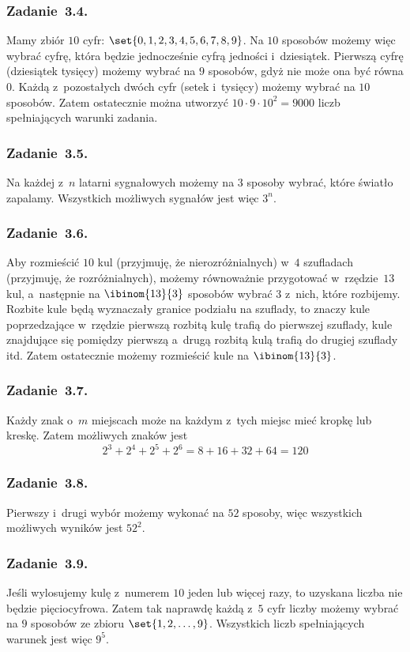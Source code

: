 \subsubsection*{Zadanie~3.4.}
Mamy zbiór \(10\) cyfr: \(\set{0, 1, 2, 3, 4, 5, 6, 7, 8, 9}\). Na \(10\) sposobów możemy więc wybrać cyfrę, która będzie jednocześnie cyfrą jedności i~dziesiątek. Pierwszą cyfrę (dziesiątek tysięcy) możemy wybrać na \(9\) sposobów, gdyż nie może ona być równa \(0\). Każdą z~pozostałych dwóch cyfr (setek i~tysięcy) możemy wybrać na \(10\) sposobów. Zatem ostatecznie można utworzyć \(10 \cdot 9 \cdot 10^2 = 9000\) liczb spełniających warunki zadania.
\subsubsection*{Zadanie~3.5.}
Na każdej z~\(n\) latarni sygnałowych możemy na \(3\) sposoby wybrać, które światło zapalamy. Wszystkich możliwych sygnałów jest więc \(3^n\).
\subsubsection*{Zadanie~3.6.}
Aby rozmieścić \(10\) kul (przyjmuję, że nierozróżnialnych) w~\(4\) szufladach (przyjmuję, że rozróżnialnych), możemy równoważnie przygotować w~rzędzie \(13\) kul, a~następnie na \(\ibinom{13}{3}\) sposobów wybrać \(3\) z~nich, które rozbijemy. Rozbite kule będą wyznaczały granice podziału na szuflady, to znaczy kule poprzedzające w~rzędzie pierwszą rozbitą kulę trafią do pierwszej szuflady, kule znajdujące się pomiędzy pierwszą a~drugą rozbitą kulą trafią do drugiej szuflady itd. Zatem ostatecznie możemy rozmieścić kule na \(\ibinom{13}{3}\).
\subsubsection*{Zadanie~3.7.}
Każdy znak o~\(m\) miejscach może na każdym z~tych miejsc mieć kropkę lub kreskę. Zatem możliwych znaków jest
\begin{equation*}
    2^3 + 2^4 + 2^5 + 2^6
        = 8 + 16 + 32 + 64
        = 120
\end{equation*}
\subsubsection*{Zadanie~3.8.}
Pierwszy i~drugi wybór możemy wykonać na \(52\) sposoby, więc wszystkich możliwych wyników jest \(52^2\).
\subsubsection*{Zadanie~3.9.}
Jeśli wylosujemy kulę z~numerem \(10\) jeden lub więcej razy, to uzyskana liczba nie będzie pięciocyfrowa. Zatem tak naprawdę każdą z~\(5\) cyfr liczby możemy wybrać na \(9\) sposobów ze zbioru \(\set{1, 2, \ldots, 9}\). Wszystkich liczb spełniających warunek jest więc \(9^5\).

